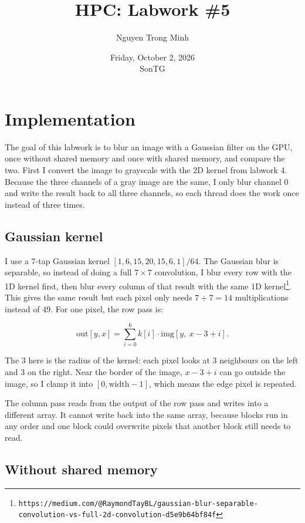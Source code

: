 \documentclass[11pt]{article}
\title{HPC: Labwork \#5}
\author{Nguyen Trong Minh}
\date{Friday, October 2, 2026 \\ SonTG}
\begin{document}
\maketitle

\section{Implementation}

The goal of this labwork is to blur an image with a Gaussian filter on the GPU, once without shared memory and once with shared memory, and compare the two. First I convert the image to grayscale with the 2D kernel from labwork 4. Because the three channels of a gray image are the same, I only blur channel 0 and write the result back to all three channels, so each thread does the work once instead of three times.

\subsection{Gaussian kernel}

I use a 7-tap Gaussian kernel $[1, 6, 15, 20, 15, 6, 1] / 64$. The Gaussian blur is separable, so instead of doing a full $7 \times 7$ convolution, I blur every row with the 1D kernel first, then blur every column of that result with the same 1D kernel\footnote{\texttt{https://medium.com/@RaymondTayBL/gaussian-blur-separable-convolution-vs-full-2d-convolution-d5e9b64bf84f}}. This gives the same result but each pixel only needs $7 + 7 = 14$ multiplications instead of $49$. For one pixel, the row pass is:

\[
    \mathrm{out}[y, x] = \sum_{i=0}^{6} k[i] \cdot \mathrm{img}[y,\ x - 3 + i].
\]

The 3 here is the radius of the kernel: each pixel looks at 3 neighbours on the left and 3 on the right. Near the border of the image, $x - 3 + i$ can go outside the image, so I clamp it into $[0, \mathrm{width} - 1]$, which means the edge pixel is repeated.

The column pass reads from the output of the row pass and writes into a different array. It cannot write back into the same array, because blocks run in any order and one block could overwrite pixels that another block still needs to read.

\subsection{Without shared memory}
\end{document}
